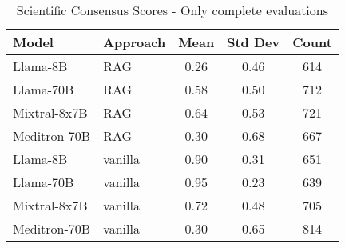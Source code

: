 \begin{table}[h]
\centering
\begin{tabular}{llccc}
\toprule
Model & Approach & Mean & Std Dev & Count \\
\midrule
Llama-8B & RAG & 0.26 & 0.46 & 614 \\
Llama-70B & RAG & 0.58 & 0.50 & 712 \\
Mixtral-8x7B & RAG & 0.64 & 0.53 & 721 \\
Meditron-70B & RAG & 0.30 & 0.68 & 667 \\
Llama-8B & vanilla & 0.90 & 0.31 & 651 \\
Llama-70B & vanilla & 0.95 & 0.23 & 639 \\
Mixtral-8x7B & vanilla & 0.72 & 0.48 & 705 \\
Meditron-70B & vanilla & 0.30 & 0.65 & 814 \\
\bottomrule
\end{tabular}
\caption{Scientific Consensus Scores - Only complete evaluations}
\label{tab:scientific_consensus_complete}
\end{table}